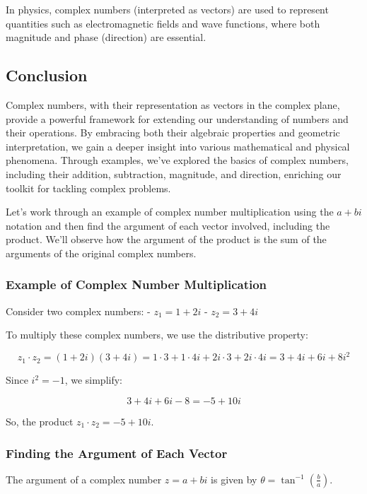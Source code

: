 \documentclass[
]{article}
\begin{document}
In physics, complex numbers (interpreted as vectors) are used to
represent quantities such as electromagnetic fields and wave functions,
where both magnitude and phase (direction) are essential.

\subsection{Conclusion}\label{conclusion}

Complex numbers, with their representation as vectors in the complex
plane, provide a powerful framework for extending our understanding of
numbers and their operations. By embracing both their algebraic
properties and geometric interpretation, we gain a deeper insight into
various mathematical and physical phenomena. Through examples, we've
explored the basics of complex numbers, including their addition,
subtraction, magnitude, and direction, enriching our toolkit for
tackling complex problems.

Let's work through an example of complex number multiplication using the
\(a+bi\) notation and then find the argument of each vector involved,
including the product. We'll observe how the argument of the product is
the sum of the arguments of the original complex numbers.

\subsubsection{Example of Complex Number
Multiplication}\label{example-of-complex-number-multiplication}

Consider two complex numbers: - \(z_1 = 1 + 2i\) - \(z_2 = 3 + 4i\)

To multiply these complex numbers, we use the distributive property:

\[
z_1 \cdot z_2 = (1 + 2i)(3 + 4i) = 1\cdot3 + 1\cdot4i + 2i\cdot3 + 2i\cdot4i = 3 + 4i + 6i + 8i^2
\]

Since \(i^2 = -1\), we simplify:

\[
3 + 4i + 6i - 8 = -5 + 10i
\]

So, the product \(z_1 \cdot z_2 = -5 + 10i\).

\subsubsection{Finding the Argument of Each
Vector}\label{finding-the-argument-of-each-vector}

The argument of a complex number \(z = a + bi\) is given by
\(\theta = \tan^{-1}\left(\frac{b}{a}\right)\).
\end{document}
